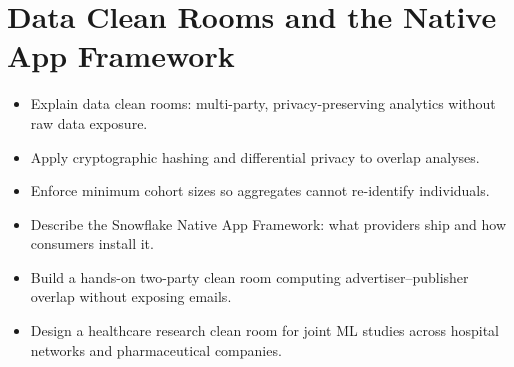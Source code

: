 \chapter{Data Clean Rooms and the Native App Framework}
%
\begin{objectives}
\begin{itemize}
    \item Explain data clean rooms: multi-party, privacy-preserving analytics without raw data exposure.
    \item Apply cryptographic hashing and differential privacy to overlap analyses.
    \item Enforce minimum cohort sizes so aggregates cannot re-identify individuals.
    \item Describe the Snowflake Native App Framework: what providers ship and how consumers install it.
    \item Build a hands-on two-party clean room computing advertiser--publisher overlap without exposing emails.
    \item Design a healthcare research clean room for joint ML studies across hospital networks and pharmaceutical companies.
\end{itemize}
\end{objectives}


